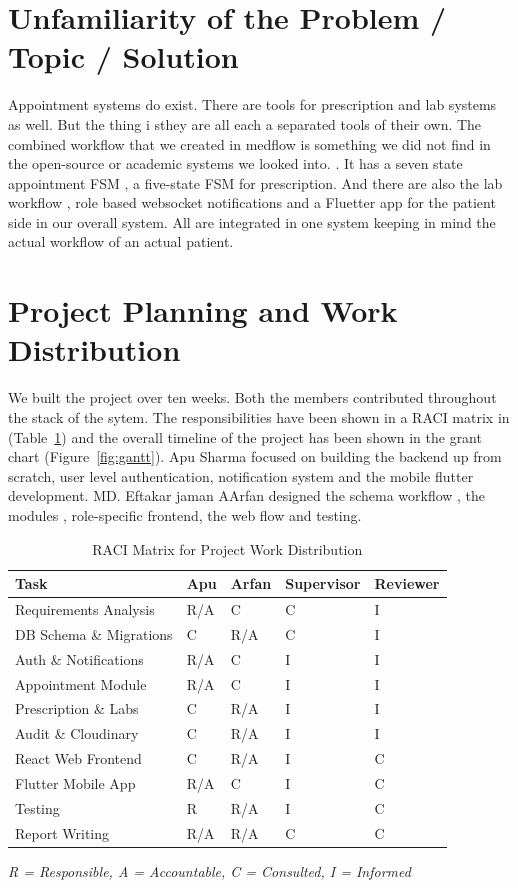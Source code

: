\documentclass[12pt,a4paper]{report}
\begin{document}
\section{Unfamiliarity of the Problem / Topic / Solution}

Appointment systems do exist. There are tools for prescription and lab systems as well. But the thing i sthey are all each a separated tools of their own. The combined workflow that we created in medflow is something we did not find in the open-source or academic systems we looked into.
\cite{r4,r6}. It has a seven state appointment FSM , a five-state FSM for prescription. And there are also the lab workflow , role based websocket notifications and a Fluetter app for the patient side in our overall system. All are integrated in one system keeping in mind the actual workflow of an actual patient.

\section{Project Planning and Work Distribution}

We built the project over ten weeks. Both the members contributed throughout the stack of the sytem. The responsibilities have been shown in a RACI matrix in (Table~\ref{tab:raci}) and the overall timeline of the project has been shown in the grant chart (Figure~\ref{fig:gantt}). Apu Sharma focused on building the backend up from scratch, user level authentication,  notification system and the mobile flutter development.
MD. Eftakar jaman AArfan designed the schema workflow , the modules , role-specific frontend, the web flow and testing.

\begin{table}[tbp]
\caption{RACI Matrix for Project Work Distribution}
\label{tab:raci}
\centering
\begin{tabular}{|p{3.5cm}|p{2.1cm}|p{2.1cm}|p{2.1cm}|p{2.1cm}|}
\hline
\textbf{Task} & \textbf{Apu} & \textbf{Arfan} & \textbf{Supervisor} & \textbf{Reviewer}\\
\hline
Requirements Analysis    & R/A & C   & C & I\\
\hline
DB Schema \& Migrations  & C   & R/A & C & I\\
\hline
Auth \& Notifications    & R/A & C   & I & I\\
\hline
Appointment Module       & R/A & C   & I & I\\
\hline
Prescription \& Labs     & C   & R/A & I & I\\
\hline
Audit \& Cloudinary      & C   & R/A & I & I\\
\hline
React Web Frontend       & C & R/A   & I & C\\
\hline
Flutter Mobile App       & R/A   & C & I & C\\
\hline
Testing                  & R   & R/A & I & C\\
\hline
Report Writing           & R/A & R/A & C & C\\
\hline
\end{tabular}
\end{table}
\textit{R = Responsible, A = Accountable, C = Consulted, I = Informed}
\end{document}
